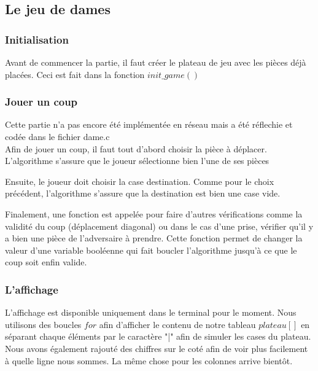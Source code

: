 \documentclass{article}
\begin{document}
    \subsection{Le jeu de dames}
    \subsubsection{Initialisation}
        Avant de commencer la partie, il faut créer le plateau de jeu avec les pièces déjà placées. Ceci est fait dans la fonction
        $init\_game()$

        \begin{changemargin}{-2cm}{-2cm}
            
        \end{changemargin}

    \subsubsection{Jouer un coup}
        Cette partie n'a pas encore été implémentée en réseau mais a été réflechie et codée dans le fichier dame.c\\
        Afin de jouer un coup, il faut tout d'abord choisir la pièce à déplacer. L'algorithme s'assure que le joueur sélectionne
        bien l'une de ses pièces

        \begin{changemargin}{-2cm}{-2cm}
            
        \end{changemargin}

        Ensuite, le joueur doit choisir la case destination. Comme pour le choix précédent, l'algorithme s'assure que la destination
        est bien une case vide.

        \begin{changemargin}{-2cm}{-2cm}
            
        \end{changemargin}

        Finalement, une fonction est appelée pour faire d'autres vérifications comme la validité du coup (déplacement diagonal)
        ou dans le cas d'une prise, vérifier qu'il y a bien une pièce de l'adversaire à prendre. Cette fonction permet de changer la
        valeur d'une variable booléenne qui fait boucler l'algorithme jusqu'à ce que le coup soit enfin valide.

    \subsubsection{L'affichage}
        L'affichage est disponible uniquement dans le terminal pour le moment. Nous utilisons des boucles $for$ afin d'afficher le
        contenu de notre tableau $plateau[]$ en séparant chaque éléments par le caractère "|" afin de simuler les cases du plateau.
        Nous avons également rajouté des chiffres sur le coté afin de voir plus facilement à quelle ligne nous sommes. La même chose
        pour les colonnes arrive bientôt.
\end{document}
